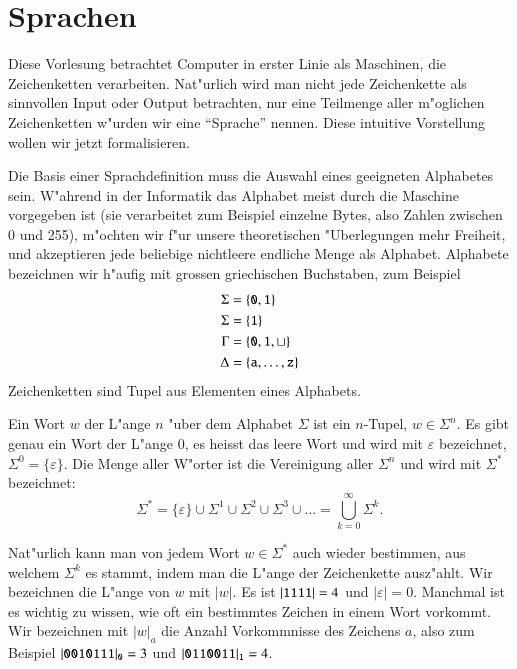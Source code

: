 %
%
%
\rhead{}
\chapter{Sprachen\label{chapter-sprachen}}
Diese Vorlesung betrachtet Computer in erster Linie als
Maschinen, die Zeichenketten verarbeiten. Nat"urlich wird man
nicht jede Zeichenkette als sinnvollen Input oder Output betrachten,
nur eine Teilmenge aller m"oglichen Zeichenketten w"urden wir
eine ``Sprache'' nennen. Diese intuitive Vorstellung wollen wir
jetzt formalisieren.

Die Basis einer Sprachdefinition muss die Auswahl eines geeigneten
Alphabetes sein. W"ahrend in der Informatik das Alphabet meist 
durch die Maschine vorgegeben ist (sie verarbeitet zum Beispiel
einzelne Bytes, also Zahlen zwischen 0 und 255), m"ochten wir f"ur
unsere theoretischen "Uberlegungen mehr Freiheit, und akzeptieren
jede beliebige nichtleere endliche Menge als Alphabet. Alphabete
bezeichnen wir h"aufig mit grossen griechischen Buchstaben, zum
Beispiel
\begin{align*}
\Sigma&=\{{\tt 0},{\tt 1}\}\\
\Sigma&=\{{\tt 1}\}\\
\Gamma&=\{{\tt 0},{\tt 1},\sqcup\}\\
\Delta&=\{{\tt a},\dots,{\tt z}\}
\end{align*}
Zeichenketten sind Tupel aus Elementen eines Alphabets.
\begin{definition}\label{def_wort}
Ein Wort $w$ der L"ange $n$ "uber dem Alphabet $\Sigma$ ist ein $n$-Tupel,
$w\in\Sigma^n$. Es gibt genau ein Wort der L"ange $0$, es heisst das
leere Wort und wird mit $\varepsilon$ bezeichnet, $\Sigma^0=\{\varepsilon\}$.
Die Menge aller W"orter
ist die Vereinigung aller $\Sigma^n$ und wird mit $\Sigma^*$ bezeichnet:
\[
\Sigma^*=\{\varepsilon\}\cup \Sigma^1\cup\Sigma^2\cup\Sigma^3\cup\dots
=\bigcup_{k=0}^\infty\Sigma^k.
\]
\end{definition}

Nat"urlich kann man von jedem Wort $w\in\Sigma^*$ auch wieder bestimmen,
aus welchem $\Sigma^k$ es stammt, indem man die L"ange der Zeichenkette
ausz"ahlt. Wir bezeichnen die L"ange von $w$ mit $|w|$. Es ist $|{\tt 1111}|=4$
und $|\varepsilon|=0$. Manchmal ist es wichtig zu wissen, wie oft ein bestimmtes
Zeichen in einem Wort vorkommt. Wir bezeichnen mit
$|w|_{a}$ die Anzahl Vorkommnisse des Zeichens $a$, also zum Beispiel
$|{\tt 0010111}|_{\tt 0}=3$ und $|{\tt 0110011}|_{\tt 1}=4$.

